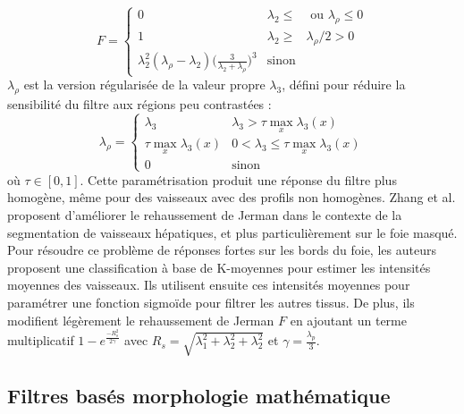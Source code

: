 \begin{equation}
\nonumber
  F =
\left\{
  \begin{array}{lll}
    0 & \lambda_2 \leqslant & \textrm{~ou~} \lambda_\rho \leqslant 0 \\
    1 & \lambda_2 \geqslant & \lambda_\rho / 2 > 0 \\
    \lambda_{2}^2(\lambda_\rho -\lambda_2)\big(\frac{3}{\lambda_2+\lambda_\rho}\big)^3 & \textrm{sinon} &
  \end{array}
  \right. 
\end{equation}
$\lambda_\rho$ est la version régularisée de la valeur propre $\lambda_3$, défini pour réduire la sensibilité du filtre aux régions peu contrastées :
\begin{equation}
\nonumber
  \lambda_\rho =
  \left\{
  \begin{array}{ll}
     \lambda_3  & \lambda_3 > \tau \max_{x} \lambda_3(x) \\
    \tau \max_{x} \lambda_3(x) & 0 < \lambda_3 \leqslant \tau \max_{x} \lambda_3(x) \\
    0  & \textrm{sinon}
  \end{array}
\right.
\end{equation}
où $\tau \in [0,1]$. Cette paramétrisation produit une réponse du filtre plus homogène, même pour des vaisseaux avec des profils non homogènes.
Zhang et al. \cite{Zhang2018_liver_fuzzy_connectedness} proposent d'améliorer le rehaussement de Jerman dans le contexte de la segmentation de vaisseaux hépatiques, et plus particulièrement sur le foie masqué. Pour résoudre ce problème de réponses fortes sur les bords du foie, les auteurs proposent une classification à base de K-moyennes pour estimer les intensités moyennes des vaisseaux. Ils utilisent ensuite ces intensités moyennes pour paramétrer une fonction sigmoïde pour filtrer les autres tissus. De plus, ils modifient légèrement le rehaussement de Jerman $F$ en ajoutant un terme multiplicatif $1-e^{ \frac{-R^2_s}{2 \gamma}}$ avec $R_s = \sqrt{\lambda^2_1 + \lambda^2_2 + \lambda^2_2}$ et $\gamma= \frac{\lambda_p}{3}$.
\subsection{Filtres basés morphologie mathématique}
